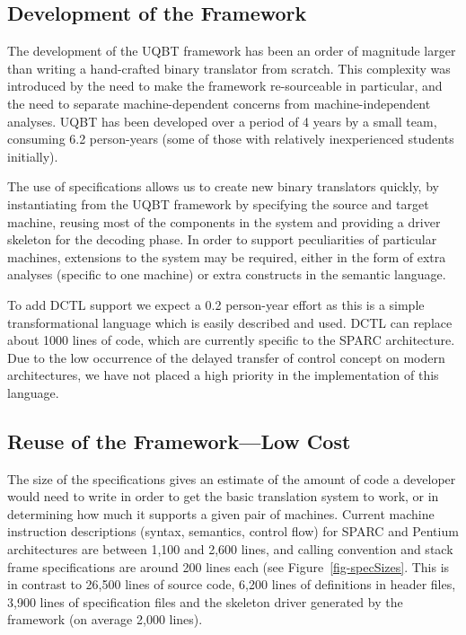\subsection{Development of the Framework}
The development of the UQBT framework has been an order of 
magnitude larger than writing a hand-crafted binary translator 
from scratch.  This complexity was introduced by the need to 
make the framework re-sourceable in particular, and the 
need to separate machine-dependent concerns from machine-independent
analyses.  UQBT has been developed over a period of 4 years 
by a small team, consuming 6.2 person-years (some of those with 
relatively inexperienced students initially).   

The use of specifications allows us to create new binary translators 
quickly, by instantiating from the UQBT framework by specifying the 
source and target machine, reusing most of the components in the system 
and providing a driver skeleton for the decoding phase.  
In order to support peculiarities of particular machines, extensions 
to the system may be required, either in the form of extra analyses 
(specific to one machine) or extra constructs in the semantic 
language. 

To add DCTL support we expect a 0.2 person-year effort as this is 
a simple transformational language which is easily described 
and used.  DCTL can replace about 1000 lines of code, which are currently 
specific to the SPARC architecture.  Due to the low occurrence
of the delayed transfer of control concept on modern architectures, 
we have not placed a high priority in the implementation of this language.  


\subsection{Reuse of the Framework---Low Cost}
The size of the specifications gives an estimate of the amount 
of code a developer would need to write in order to get 
the basic translation system to work, or in determining how 
much it supports a given pair of machines.  
Current machine instruction descriptions (syntax, semantics, 
control flow) for SPARC and Pentium architectures are between 1,100 
and 2,600 lines, and calling convention and stack frame specifications 
are around 200 lines each (see Figure~\ref{fig-specSizes}.
This is in contrast to 26,500 lines of source code, 
6,200 lines of definitions in header files, 
3,900 lines of specification files and the 
skeleton driver generated by the framework (on average 2,000 lines).  

